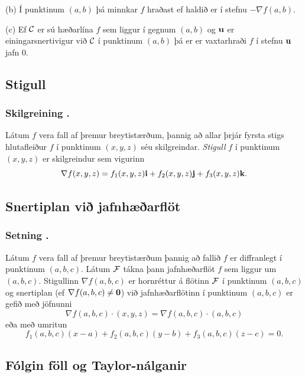 \medskip
(b) Í punktinum $(a,b)$ þá minnkar $f$ hraðast ef haldið er í stefnu
$-\nabla f(a,b)$.  

\medskip
(c)  Ef $\cal C$ er sú hæðarlína $f$ sem liggur í gegnum $(a,b)$ og
$\mbox{${\bf u}$}$ er einingarsnertivigur við $\cal C$ í punktinum $(a,b)$ þá er
er vaxtarhraði $f$ í stefnu $\mbox{${\bf u}$}$ jafn 0. 




\subsection{Stigull} 

\subsubsection{Skilgreining \kaflanr.}
 Látum $f$ vera fall af þremur
breytistærðum, þannig að allar þrjár fyrsta stigs hlutafleiður $f$ í
punktinum $(x,y,z)$ séu skilgreindar.  {\em Stigull} $f$ í punktinum
$(x,y,z)$ er skilgreindur sem vigurinn
$$\nabla f(x,y,z)=f_1(x,y,z)\mbox{${\bf i}$}+f_2(x,y,z)\mbox{${\bf j}$}+f_3(x,y,z)\mbox{${\bf k}$}.$$





\subsection{Snertiplan við jafnhæðarflöt} 

\subsubsection{Setning \kaflanr.}
 Látum $f$ vera fall af þremur
breytistærðum þannig að fallið $f$ er diffranlegt í punktinum $(a,b,c)$.  Látum $\cal F$ tákna þann jafnhæðarflöt $f$ sem liggur um $(a,b,c)$.  Stigullinn $\nabla f(a,b,c)$ er hornréttur á flötinn $\cal F$ í punktinum $(a,b,c)$ og snertiplan (ef $\nabla f(a,b,c)\neq\mbox{${\bf 0}$}$) 
við jafnhæðarflötinn í punktinum $(a,b,c)$ er gefið með jöfnunni 
$$\nabla f(a,b,c)\cdot(x,y,z)=\nabla f(a,b,c)\cdot(a,b,c)$$
eða með umritun
$$f_1(a,b,c)(x-a)+f_2(a,b,c)(y-b)+f_3(a,b,c)(z-c)=0.$$





\subsection{Fólgin föll og Taylor-nálganir} 

